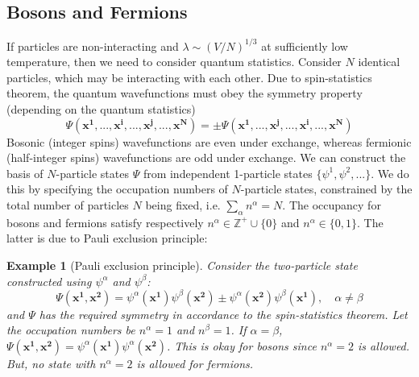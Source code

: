 \documentclass[a4paper]{article}
\newtheorem{eg}{Example}[section]
\theoremstyle{new}
\begin{document}
\subsection{Bosons and Fermions}
If particles are non-interacting and $\lambda\sim(V/N)^{1/3}$ at sufficiently low temperature, then we need to consider quantum statistics. Consider $N$ identical particles, which may be interacting with each other. Due to spin-statistics theorem, the quantum wavefunctions must obey the symmetry property (depending on the quantum statistics)
$$\Psi(\mathbf{x^1},...,\mathbf{x^i},...,\mathbf{x^j},...,\mathbf{x^N})=\pm\Psi(\mathbf{x^1},...,\mathbf{x^j},...,\mathbf{x^i},...,\mathbf{x^N})$$
Bosonic (integer spins) wavefunctions are even under exchange, whereas fermionic (half-integer spins) wavefunctions are odd under exchange. We can construct the basis of $N$-particle states $\Psi$ from independent 1-particle states $\{\psi^1, \psi^2,...\}$.  We do this by specifying the occupation numbers of $N$-particle states, constrained by the total number of particles $N$ being fixed, i.e. $\sum_\alpha n^\alpha=N$. The occupancy for bosons and fermions satisfy respectively $n^\alpha\in\mathbb{Z}^+\cup\{0\}$ and $n^\alpha\in\{0,1\}$. The latter is due to Pauli exclusion principle:
\begin{eg}[Pauli exclusion principle]
Consider the two-particle state constructed using $\psi^\alpha$ and $\psi^\beta$:
$$\Psi(\mathbf{x^1},\mathbf{x^2})=\psi^\alpha(\mathbf{x^1})\psi^\beta(\mathbf{x^2})\pm\psi^\alpha(\mathbf{x^2})\psi^\beta(\mathbf{x^1}),\quad\alpha\neq\beta$$
and $\Psi$ has the required symmetry in accordance to the spin-statistics theorem. Let the occupation numbers be $n^\alpha=1$ and $n^\beta =1$. If $\alpha=\beta$, $\Psi(\mathbf{x^1},\mathbf{x^2})=\psi^\alpha(\mathbf{x^1})\psi^\alpha(\mathbf{x^2})$. This is okay for bosons since $n^\alpha=2$ is allowed. But, no state with $n^\alpha=2$ is allowed for fermions.
\end{eg}
\end{document}
